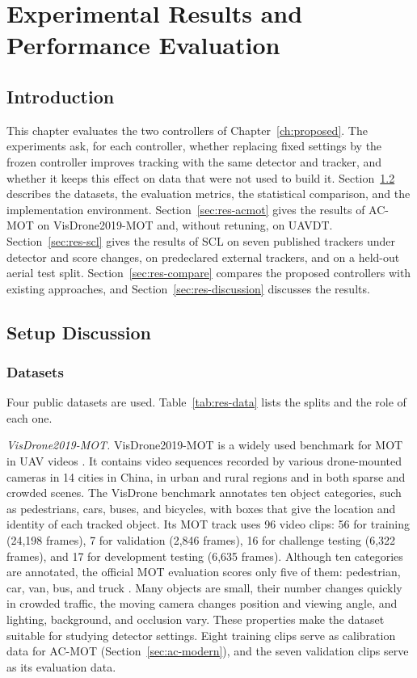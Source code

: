 \chapter{Experimental Results and Performance Evaluation}\label{ch:results}

\section{Introduction}\label{sec:res-intro}
This chapter evaluates the two controllers of Chapter~\ref{ch:proposed}. The experiments ask, for each controller, whether replacing fixed settings by the frozen controller improves tracking with the same detector and tracker, and whether it keeps this effect on data that were not used to build it. Section~\ref{sec:res-setup} describes the datasets, the evaluation metrics, the statistical comparison, and the implementation environment. Section~\ref{sec:res-acmot} gives the results of AC-MOT on VisDrone2019-MOT and, without retuning, on UAVDT. Section~\ref{sec:res-scl} gives the results of SCL on seven published trackers under detector and score changes, on predeclared external trackers, and on a held-out aerial test split. Section~\ref{sec:res-compare} compares the proposed controllers with existing approaches, and Section~\ref{sec:res-discussion} discusses the results.

\section{Setup Discussion}\label{sec:res-setup}

\subsection{Datasets}\label{sec:res-datasets}
Four public datasets are used. Table~\ref{tab:res-data} lists the splits and the role of each one.

\emph{VisDrone2019-MOT.} VisDrone2019-MOT is a widely used benchmark for MOT in UAV videos \cite{zhu2022visdrone}. It contains video sequences recorded by various drone-mounted cameras in 14 cities in China, in urban and rural regions and in both sparse and crowded scenes. The VisDrone benchmark annotates ten object categories, such as pedestrians, cars, buses, and bicycles, with boxes that give the location and identity of each tracked object. Its MOT track uses 96 video clips: 56 for training (24,198 frames), 7 for validation (2,846 frames), 16 for challenge testing (6,322 frames), and 17 for development testing (6,635 frames). Although ten categories are annotated, the official MOT evaluation scores only five of them: pedestrian, car, van, bus, and truck \cite{zhu2022visdrone}. Many objects are small, their number changes quickly in crowded traffic, the moving camera changes position and viewing angle, and lighting, background, and occlusion vary. These properties make the dataset suitable for studying detector settings. Eight training clips serve as calibration data for AC-MOT (Section~\ref{sec:ac-modern}), and the seven validation clips serve as its evaluation data.

